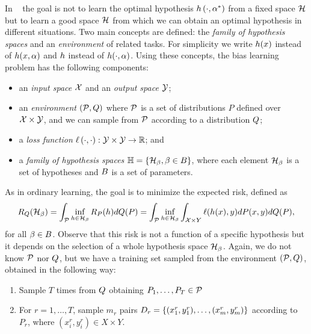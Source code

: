 In ~\cite{baxter2000model} the goal is not to learn the optimal hypothesis $h\left(\cdot, \alpha^*\right)$ from a fixed space $\mathcal{H}$ but to learn a good space $\mathcal{H}$ from which we can obtain an optimal hypothesis in different situations.
%
Two main concepts are defined: the \emph{family of hypothesis spaces} and an \emph{environment} of related tasks. 
For simplicity we write $h(x)$ instead of $h(x, \alpha)$ and $h$ instead of $h(\cdot, \alpha)$.
Using these concepts, the bias learning problem has the following components:
\begin{itemize}
    \item an \emph{input space} $\mathcal{X}$ and an \emph{output space} $\mathcal{Y}$;
    \item an \emph{environment} $(\mathcal{P}, Q)$ where $\mathcal{P}$ is a set of distributions $P$ defined over $\mathcal{X} \times \mathcal{Y}$, and we can sample from $\mathcal{P}$ according to a distribution $Q$;
    \item a \emph{loss function} $\ell\left( \cdot, \cdot\right):\mathcal{Y} \times \mathcal{Y} \to \mathbb{R}$; and
    \item a \emph{family of hypothesis spaces} $\mathbb{H} = \left\{\mathcal{H}_\beta, \beta \in B\right\}$, where each element $\mathcal{H}_\beta$ is a set of hypotheses and $B$ is a set of parameters.
\end{itemize}
As in ordinary learning, the goal is to minimize the expected risk, defined as
\begin{equation}\label{eq:biaslearn_exprisk}
    \bexprisk(\hypspace_\fparam) = \int_{\bprobspace} \inf_{\hypf \in \hypspace_\fparam} \risk_P(\hypf) d\bdistf(P) = \int_{\bprobspace} \inf_{\hypf \in \hypspace_\fparam} \int_{\Xspace \times Y} \lossf(h(x), y) dP(x, y) d\bdistf(P) ,
\end{equation}
for all $\beta \in B$.
Observe that this risk is not a function of a specific hypothesis but it depends on the selection of a whole hypothesis space $\mathcal{H}_\beta$.
Again, we do not know $\mathcal{P}$ nor $Q$, but we have a training set sampled from the environment $(\mathcal{P}, Q)$, obtained in the following way:
\begin{enumerate}
    \item Sample $T$ times from $Q$ obtaining $P_1, \ldots, P_T \in \mathcal{P}$
    \item For $r=1, \ldots, T$, sample $m_r$ pairs $D_r = \{(x_1^r, y_1^r), \ldots, (x_m^r, y_m^r)\}$ according to $P_r$, where $(x_i^r, y_i^r) \in X \times Y$.
\end{enumerate}
